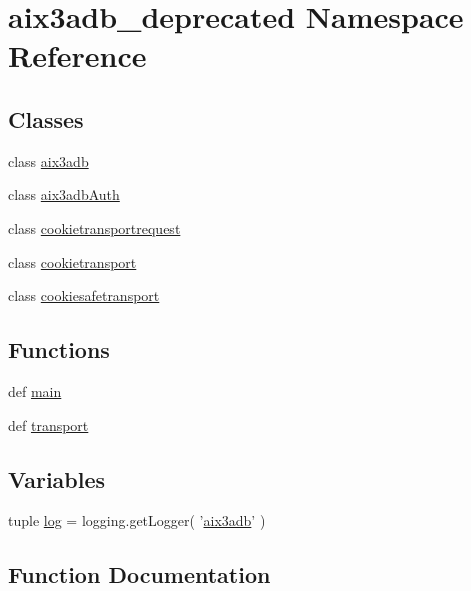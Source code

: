 \section{aix3adb\-\_\-deprecated Namespace Reference}
\label{namespaceaix3adb__deprecated}
\subsection*{Classes}
\begin{DoxyCompactItemize}
\item 
class \hyperlink{classaix3adb__deprecated_1_1aix3adb}{aix3adb}
\item 
class \hyperlink{classaix3adb__deprecated_1_1aix3adbAuth}{aix3adb\-Auth}
\item 
class \hyperlink{classaix3adb__deprecated_1_1cookietransportrequest}{cookietransportrequest}
\item 
class \hyperlink{classaix3adb__deprecated_1_1cookietransport}{cookietransport}
\item 
class \hyperlink{classaix3adb__deprecated_1_1cookiesafetransport}{cookiesafetransport}
\end{DoxyCompactItemize}
\subsection*{Functions}
\begin{DoxyCompactItemize}
\item 
def \hyperlink{namespaceaix3adb__deprecated_ae8c273eca20fd31b675a28e46f7bab3c}{main}
\item 
def \hyperlink{namespaceaix3adb__deprecated_a6ed3538701cfa12539c0d4a3f3693a5a}{transport}
\end{DoxyCompactItemize}
\subsection*{Variables}
\begin{DoxyCompactItemize}
\item 
tuple \hyperlink{namespaceaix3adb__deprecated_a162407c59dacc7621a5caf72adc9b362}{log} = logging.\-get\-Logger( '\hyperlink{classaix3adb__deprecated_1_1aix3adb}{aix3adb}' )
\end{DoxyCompactItemize}


\subsection{Function Documentation}
